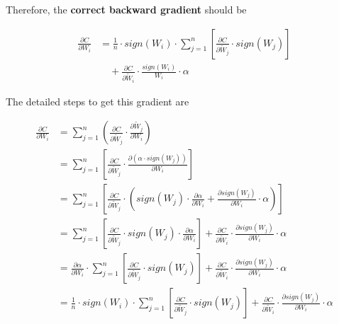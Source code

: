 \documentclass[12pt]{article} %
\begin{document}
Therefore, the \textbf{correct backward gradient} should be

\begin{equation}
\begin{aligned}
	\frac{\partial C}{\partial W_{i}} &= 
	\frac{1}{n} \cdot sign(W_{i}) \cdot 
	\sum_{j=1}^{n}[\frac{\partial C}{\partial \widetilde{W}_j} \cdot sign(W_j)]\\
	&\quad +
	\frac{\partial C}{\partial \widetilde{W}_i} \cdot
	\frac{sign(W_i)}{W_i} \cdot \alpha
\end{aligned}
\end{equation}

The detailed steps to get this gradient are

\begin{equation}
\begin{aligned}
	\frac{\partial C}{\partial W_{i}}
	&= 
	\sum_{j=1}^{n} (\frac{\partial C}{\partial \widetilde{W}_j}\cdot
	\frac{\partial \widetilde{W}_j}{\partial W_i}) 
	\\ &=
	\sum_{j=1}^{n} [\frac{\partial C}{\partial \widetilde{W}_j}\cdot
	\frac{\partial (\alpha \cdot sign(W_j))}{\partial W_i}] 
	\\ &=
	\sum_{j=1}^{n} [\frac{\partial C}{\partial \widetilde{W}_j}\cdot
	(sign(W_j)\cdot\frac{\partial \alpha}{\partial W_i} + 
	\frac{\partial sign(W_j)}{\partial W_i}\cdot\alpha)]
	\\ &=
	\sum_{j=1}^{n} [\frac{\partial C}{\partial \widetilde{W}_j}\cdot
	sign(W_j)\cdot\frac{\partial \alpha}{\partial W_i}] + 
	\frac{\partial C}{\partial \widetilde{W}_i} \cdot
	\frac{\partial sign(W_j)}{\partial W_i}\cdot\alpha
	\\ &=
	\frac{\partial \alpha}{\partial W_i}\cdot
	\sum_{j=1}^{n} [\frac{\partial C}{\partial \widetilde{W}_j}\cdot
	sign(W_j)] + 
	\frac{\partial C}{\partial \widetilde{W}_i} \cdot
	\frac{\partial sign(W_j)}{\partial W_i}\cdot\alpha
	\\ &=
	\frac{1}{n}\cdot sign(W_i) \cdot
	\sum_{j=1}^{n} [\frac{\partial C}{\partial \widetilde{W}_j}\cdot
	sign(W_j)] + 
	\frac{\partial C}{\partial \widetilde{W}_i} \cdot
	\frac{\partial sign(W_j)}{\partial W_i}\cdot\alpha
\end{aligned}
\end{equation}
\end{document}
